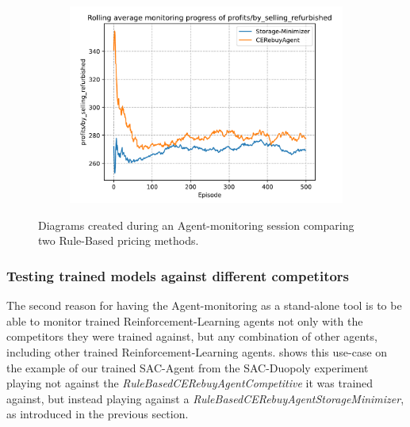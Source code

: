\begin{figure}[t]
	\begin{subfigure}{0.33\textwidth}
		\centering
		\includegraphics[width = \textwidth]{images/experiments/rulebased/RuleBasedMonitoringProfitsRefurbished.pdf}\\
		\label{fig:RulebasedAgentMonitoring3}
	\end{subfigure}
	\caption{Diagrams created during an Agent-monitoring session comparing two Rule-Based pricing methods.}\label{fig:RulebasedAgentMonitoring}
\end{figure}

\subsubsection*{Testing trained models against different competitors}

The second reason for having the Agent-monitoring as a stand-alone tool is to be able to monitor trained Reinforcement-Learning agents not only with the competitors they were trained against, but any combination of other agents, including other trained Reinforcement-Learning agents.  shows this use-case on the example of our trained SAC-Agent from the SAC-Duopoly experiment playing not against the \emph{RuleBasedCERebuyAgentCompetitive} it was trained against, but instead playing against a \emph{RuleBasedCERebuyAgentStorageMinimizer}, as introduced in the previous section.

